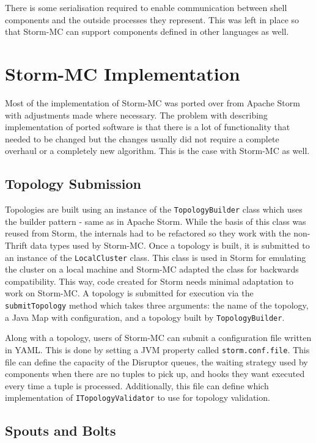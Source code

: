There is some serialisation required to enable communication between shell components and the outside processes they represent. This was left in place so that Storm-MC can support components defined in other languages as well.

\section{Storm-MC Implementation}
\label{sec:implementation}

Most of the implementation of Storm-MC was ported over from Apache Storm with adjustments made where necessary. The problem with describing implementation of ported software is that there is a lot of functionality that needed to be changed but the changes usually did not require a complete overhaul or a completely new algorithm. This is the case with Storm-MC as well.

\subsection{Topology Submission}

Topologies are built using an instance of the \texttt{TopologyBuilder} class which uses the builder pattern - same as in Apache Storm. While the basis  of this class was reused from Storm, the internals had to be refactored so they work with the non-Thrift data types used by Storm-MC. Once a topology is built, it is submitted to an instance of the \texttt{LocalCluster} class. This class is used in Storm for emulating the cluster on a local machine and Storm-MC adapted the class for backwards compatibility. This way, code created for Storm needs minimal adaptation to work on Storm-MC. A topology is submitted for execution via the \texttt{submitTopology} method which takes three arguments: the name of the topology, a Java Map with configuration, and a topology built by \texttt{TopologyBuilder}.

Along with a topology, users of Storm-MC can submit a configuration file written in YAML. This is done by setting a JVM property called \texttt{storm.conf.file}. This file can define the capacity of the Disruptor queues, the waiting strategy used by components when there are no tuples to pick up, and hooks they want executed every time a tuple is processed. Additionally, this file can define which implementation of \texttt{ITopologyValidator} to use for topology validation.

\subsection{Spouts and Bolts}

